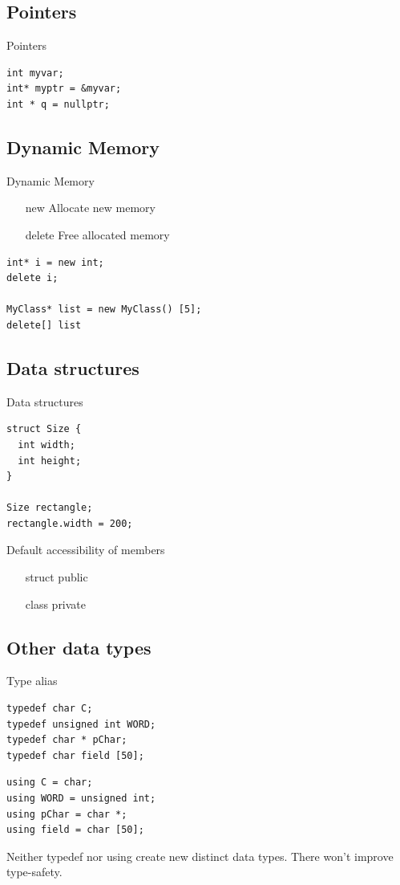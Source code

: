 \documentclass{beamer}
\begin{document}
\subsection{Pointers}
\begin{frame}[fragile]{Pointers}
\begin{lstlisting}
int myvar;
int* myptr = &myvar;
int * q = nullptr;
\end{lstlisting}
\end{frame}

\subsection{Dynamic Memory}
\begin{frame}[fragile]{Dynamic Memory}
\begin{itemize}
  \item [new] Allocate new memory
  \item [delete] Free allocated memory
\end{itemize}
\begin{lstlisting}
int* i = new int;
delete i;

MyClass* list = new MyClass() [5];
delete[] list
\end{lstlisting}
\end{frame}

\subsection{Data structures}
\begin{frame}[fragile]{Data structures}
\begin{lstlisting}
struct Size {
  int width;
  int height;
}

Size rectangle;
rectangle.width = 200;
\end{lstlisting}
\end{frame}

\begin{frame}{Default accessibility of members}
\begin{itemize}
  \item [struct] public
  \item [class] private
\end{itemize}
\end{frame}

\subsection{Other data types}
\begin{frame}[fragile]{Type alias}
\begin{lstlisting}[caption=type alias with typedef]
typedef char C;
typedef unsigned int WORD;
typedef char * pChar;
typedef char field [50];
\end{lstlisting}

\begin{lstlisting}[caption=type alias with using]
using C = char;
using WORD = unsigned int;
using pChar = char *;
using field = char [50];
\end{lstlisting}

Neither typedef nor using create new distinct data types. There won't improve
type-safety.
\end{frame}
\end{document}
